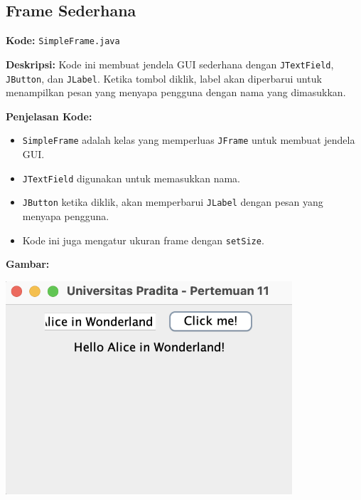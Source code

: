 \subsection{Frame Sederhana}

\textbf{Kode:} \texttt{SimpleFrame.java}

\textbf{Deskripsi:} Kode ini membuat jendela GUI sederhana dengan \texttt{JTextField}, \texttt{JButton}, dan \texttt{JLabel}. Ketika tombol diklik, label akan diperbarui untuk menampilkan pesan yang menyapa pengguna dengan nama yang dimasukkan.

\textbf{Penjelasan Kode:}
\begin{itemize}
	\item \texttt{SimpleFrame} adalah kelas yang memperluas \texttt{JFrame} untuk membuat jendela GUI.
	\item \texttt{JTextField} digunakan untuk memasukkan nama.
	\item \texttt{JButton} ketika diklik, akan memperbarui \texttt{JLabel} dengan pesan yang menyapa pengguna.
	\item Kode ini juga mengatur ukuran frame dengan \texttt{setSize}.
\end{itemize}

\textbf{Gambar:} \\
\begin{center}
	\includegraphics[width=0.8\textwidth]{assets/pertemuan11/simple_frame.png}
\end{center}


